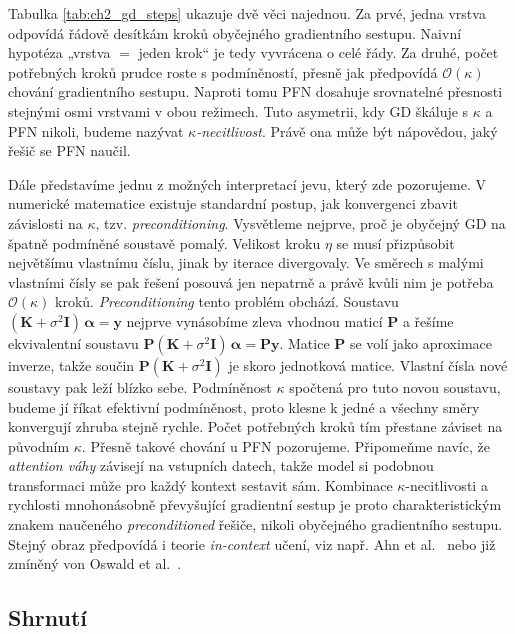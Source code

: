 Tabulka \ref{tab:ch2_gd_steps} ukazuje dvě věci najednou.
Za prvé, jedna vrstva odpovídá řádově desítkám kroků obyčejného gradientního sestupu.
Naivní hypotéza „vrstva $=$ jeden krok“ je tedy vyvrácena o celé řády.
Za druhé, počet potřebných kroků prudce roste s podmíněností, přesně jak předpovídá $\mathcal{O}(\kappa)$ chování gradientního sestupu.
Naproti tomu PFN dosahuje srovnatelné přesnosti stejnými osmi vrstvami v obou režimech.
Tuto asymetrii, kdy GD škáluje s $\kappa$ a PFN nikoli, budeme nazývat \emph{$\kappa$-necitlivost}.
Právě ona může být nápovědou, jaký řešič se PFN naučil.
\par    

Dále představíme jednu z možných interpretací jevu, který zde pozorujeme.
V numerické matematice existuje standardní postup, jak konvergenci zbavit závislosti na $\kappa$, tzv. \emph{preconditioning}.
Vysvětleme nejprve, proč je obyčejný GD na špatně podmíněné soustavě pomalý.
Velikost kroku $\eta$ se musí přizpůsobit největšímu vlastnímu číslu, jinak by iterace divergovaly.
Ve směrech s malými vlastními čísly se pak řešení posouvá jen nepatrně a právě kvůli nim je potřeba $\mathcal{O}(\kappa)$ kroků.
\emph{Preconditioning} tento problém obchází.
Soustavu $(\mathbf{K}+\sigma^2\mathbf{I})\,\boldsymbol{\alpha} = \mathbf{y}$ nejprve vynásobíme zleva vhodnou maticí $\mathbf{P}$ a řešíme ekvivalentní soustavu $\mathbf{P}(\mathbf{K}+\sigma^2\mathbf{I})\,\boldsymbol{\alpha} = \mathbf{P}\mathbf{y}$.
Matice $\mathbf{P}$ se volí jako aproximace inverze, takže součin $\mathbf{P}(\mathbf{K}+\sigma^2\mathbf{I})$ je skoro jednotková matice.
Vlastní čísla nové soustavy pak leží blízko sebe.
Podmíněnost $\kappa$ spočtená pro tuto novou soustavu, budeme jí říkat efektivní podmíněnost, proto klesne k jedné a všechny směry konvergují zhruba stejně rychle.
Počet potřebných kroků tím přestane záviset na původním $\kappa$.
Přesně takové chování u PFN pozorujeme.
Připomeňme navíc, že \emph{attention váhy} závisejí na vstupních datech, takže model si podobnou transformaci může pro každý kontext sestavit sám.
Kombinace $\kappa$-necitlivosti a rychlosti mnohonásobně převyšující gradientní sestup je proto charakteristickým znakem naučeného \emph{preconditioned} řešiče, nikoli obyčejného gradientního sestupu.
Stejný obraz předpovídá i teorie \emph{in-context} učení, viz např. Ahn et al.~\cite{ahn2023} nebo již zmíněný von Oswald et al.~\cite{vonoswald2023}.
\par

\subsection{Shrnutí}
\label{subsec:ch2-reseni-shrnuti}

